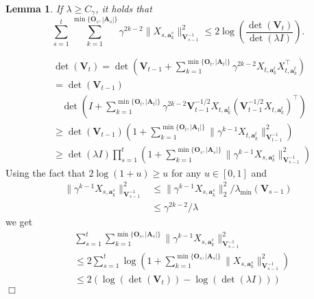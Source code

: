 \documentclass{article}
\newcommand{\bA}{\mathbf{A}}
\newcommand{\ba}{\mathbf{a}}
\newcommand{\bO}{\mathbf{O}}
\newcommand{\bV}{\mathbf{V}}
\newcommand{\abs}[1]{\left| #1 \right|}
\newcommand{\norm}[1]{\| #1 \|}
\newtheorem{lemma}[theorem]{Lemma}%
\newenvironment{proof}{\noindent {\textbf{Proof. }}}{$\Box$ \medskip}
\begin{document}
\begin{lemma}
If $\lambda \geq C_\gamma$, it holds that
$$
\sum_{s=1}^t \sum_{k=1}^{\min\{\bO_s, \abs{\bA_s}\}}\gamma^{2k-2}\norm{X_{s,\ba_{k}^s}}_{\bV_{s-1}^{-1}}^2 \leq 2\log(\frac{\det(\bV_t)}{\det(\lambda I)}).
$$
\end{lemma}
\begin{proof}
\begin{align*}
&\det(\bV_t) = \det(\bV_{t-1} + \sum_{k=1}^{\min\{\bO_t, \abs{\bA_t}\}} \gamma^{2k-2}X_{t,\ba_k^{t}}X_{t, \ba_k^{t}}^{\top})\\
&=\det(\bV_{t-1})\\
&~~~~\det(I + \sum_{k=1}^{\min\{\bO_t, \abs{\bA_t}\}} \gamma^{2k-2}\bV_{t-1}^{-1/2}X_{t,\ba_{k}^{t}} (\bV_{t-1}^{-1/2}X_{t,\ba_{k}^{t}})^{\top})\\
&\geq \det(\bV_{t-1}) (1 + \sum_{k=1}^{\min\{\bO_t, \abs{\bA_t}\}} \norm{\gamma^{k-1}X_{t,\ba_k^t}}_{\bV_{t-1}^{-1}}^2)\\
&\geq \det(\lambda I)\prod_{s=1}^{t}(1 + \sum_{k=1}^{\min\{\bO_s, \abs{\bA_s}\}} \norm{\gamma^{k-1}X_{s,\ba_k^s}}_{\bV_{s-1}^{-1}}^2)
\end{align*}
Using the fact that $ 2\log(1+u) \geq u$ for any $u \in [0,1]$ and 
\begin{align*}
\norm{\gamma^{k-1}X_{s,\ba_k^s}}_{\bV_{s-1}^{-1}}^2 &\leq \norm{\gamma^{k-1}X_{s,\ba_k^s}}_2^2/\lambda_{\min}(\bV_{s-1})\\
& \leq \gamma^{2k-2}/\lambda
\end{align*}
we get
\begin{align*}
&\sum_{s=1}^t \sum_{k=1}^{\min\{\bO_s, \abs{\bA_s}\}}\norm{\gamma^{k-1}X_{s,\ba_{k}^s}}_{\bV_{s-1}^{-1}}^2 \\
&\leq 2\sum_{s=1}^t\log(1 + \sum_{k=1}^{\min\{\bO_s, \abs{\bA_s}\}} \norm{X_{s,\ba_k^s}}_{\bV_{s-1}^{-1}}^2)\\
&\leq 2(\log(\det(\bV_t)) - \log(\det(\lambda I)))
\end{align*}
\end{proof}
	
	
\nocite{langley00}
	


	
\end{document}
